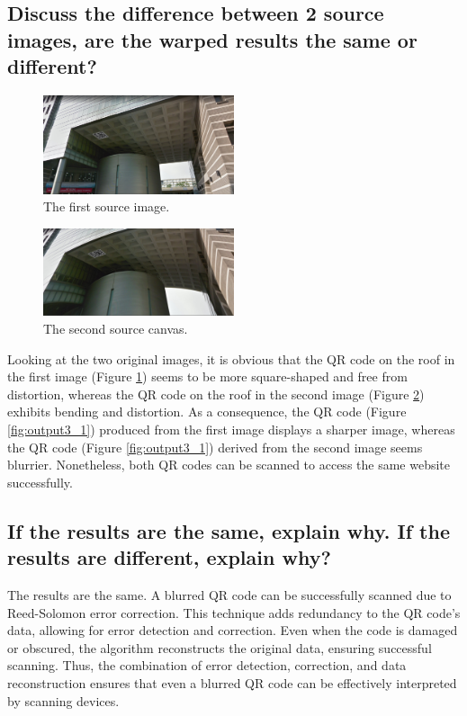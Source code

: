 \documentclass[a4paper, 12pt]{article}
\begin{document}
\subsection{Discuss the difference between 2 source images, are the warped results the same or different?}

\begin{figure}[H]
    \centering
    \includegraphics[width=0.5\textwidth]{./resource/BL_secret1.png}
    \caption{The first source image.}
    \label{fig:BL_secret1}
\end{figure}

\begin{figure}[H]
    \centering
    \includegraphics[width=0.5\textwidth]{./resource/BL_secret2.png}
    \caption{The second source canvas.}
    \label{fig:BL_secret2}
\end{figure}

Looking at the two original images, it is obvious that the QR code on the roof in the first image (Figure \ref{fig:BL_secret1}) seems to be more square-shaped and free from distortion, whereas the QR code on the roof in the second image (Figure \ref{fig:BL_secret2}) exhibits bending and distortion. As a consequence, the QR code (Figure \ref{fig:output3_1}) produced from the first image displays a sharper image, whereas the QR code (Figure \ref{fig:output3_1}) derived from the second image seems blurrier. Nonetheless, both QR codes can be scanned to access the same website successfully.

\subsection{If the results are the same, explain why. If the results are different, explain why?}
The results are the same. A blurred QR code can be successfully scanned due to Reed-Solomon error correction. This technique adds redundancy to the QR code's data, allowing for error detection and correction. Even when the code is damaged or obscured, the algorithm reconstructs the original data, ensuring successful scanning. Thus, the combination of error detection, correction, and data reconstruction ensures that even a blurred QR code can be effectively interpreted by scanning devices.
\end{document}
